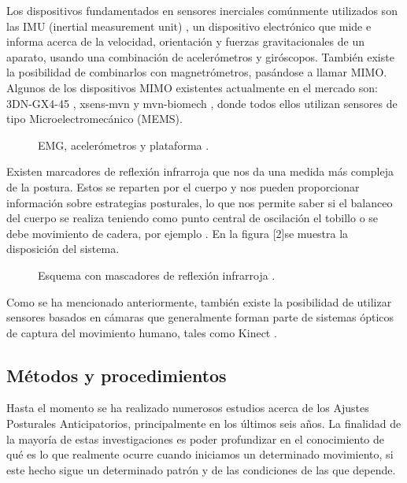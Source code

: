 Los dispositivos fundamentados en sensores inerciales comúnmente utilizados son las IMU (inertial measurement unit) , un dispositivo electrónico que mide e informa acerca de la velocidad, orientación y fuerzas gravitacionales de un aparato, usando una combinación de acelerómetros y giróscopos.
 También existe la posibilidad de combinarlos con magnetrómetros, pasándose a llamar MIMO. Algunos de los dispositivos MIMO existentes actualmente en el mercado son: 3DN-GX4-45 \cite{Instr2},  xsens-mvn \cite{Instr3} y mvn-biomech \cite{Instr4}, donde todos ellos utilizan sensores de tipo Microelectromecánico (MEMS).
 
 \begin{figure}[H]
 	\centering
 	\caption{EMG, acelerómetros y plataforma \cite{Gay2011}.}
 	\label{fig:arte1}
 \end{figure}
 
Existen marcadores de reflexión infrarroja que nos da una medida más compleja de la postura. Estos se reparten por el cuerpo y nos pueden proporcionar información sobre estrategias posturales, lo que nos permite saber si el balanceo del cuerpo se realiza teniendo como punto central de oscilación el tobillo o se debe movimiento de cadera, por ejemplo . En la figura [2]se muestra la disposición del sistema.

\begin{figure}[H]
	\centering
	\caption{Esquema con mascadores de reflexión infrarroja \cite{Teddy2013}.}
	\label{fig:arte2}
\end{figure}

Como se ha mencionado anteriormente, también existe la posibilidad de utilizar sensores basados en cámaras que generalmente forman parte de sistemas ópticos de captura del movimiento humano, tales como Kinect \cite{Instr5}.


\subsection{M\'etodos y procedimientos}

Hasta el momento se ha realizado numerosos estudios acerca de los Ajustes Posturales Anticipatorios, principalmente en los últimos seis años. 
La finalidad de la mayoría de estas investigaciones es poder profundizar en el conocimiento de qué es lo que realmente ocurre cuando iniciamos un determinado movimiento, si este hecho sigue un determinado patrón y de las condiciones de las que depende.


